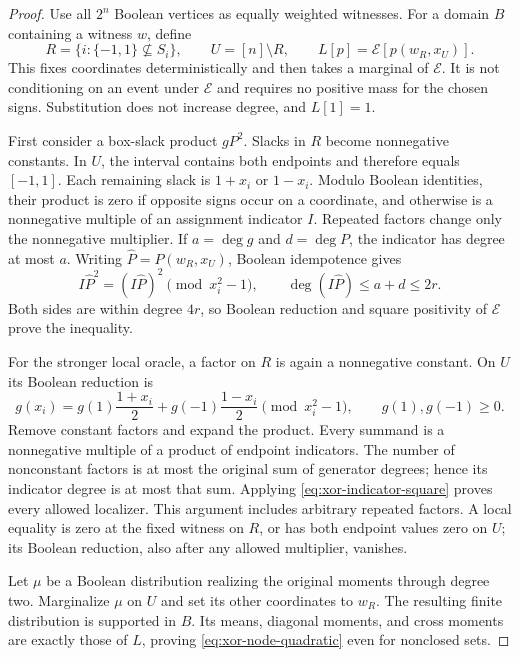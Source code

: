 \begin{proof}
Use all $2^n$ Boolean vertices as equally weighted witnesses. For a domain
$B$ containing a witness $w$, define
\[
 R=\{i:\{-1,1\}\not\subseteq S_i\},\qquad U=[n]\setminus R,
 \qquad L[p]=\mathcal E[p(w_R,x_U)].
\]
This fixes coordinates deterministically and then takes a marginal of
$\mathcal E$. It is not conditioning on an event under $\mathcal E$ and
requires no positive mass for the chosen signs. Substitution does not
increase degree, and $L[1]=1$.

First consider a box-slack product $gP^2$. Slacks in $R$ become
nonnegative constants. In $U$, the interval contains both endpoints and
therefore equals $[-1,1]$. Each remaining slack is $1+x_i$ or $1-x_i$.
Modulo Boolean identities, their product is zero if opposite signs occur
on a coordinate, and otherwise is a nonnegative multiple of an assignment
indicator $I$. Repeated factors change only the nonnegative multiplier.
If $a=\deg g$ and $d=\deg P$, the indicator has degree at most $a$.
Writing $\widehat P=P(w_R,x_U)$, Boolean idempotence gives
\begin{equation}\label{eq:xor-indicator-square}
 I\widehat P^2=(I\widehat P)^2\pmod{x_i^2-1},\qquad
 \deg(I\widehat P)\le a+d\le2r.
\end{equation}
Both sides are within degree $4r$, so Boolean reduction and square
positivity of $\mathcal E$ prove the inequality.

For the stronger local oracle, a factor on $R$ is again a nonnegative
constant. On $U$ its Boolean reduction is
\begin{equation}\label{eq:xor-local-endpoints}
 g(x_i)=g(1)\frac{1+x_i}{2}+g(-1)\frac{1-x_i}{2}
 \pmod{x_i^2-1},\qquad g(1),g(-1)\ge0.
\end{equation}
Remove constant factors and expand the product. Every summand is a
nonnegative multiple of a product of endpoint indicators. The number of
nonconstant factors is at most the original sum of generator degrees;
hence its indicator degree is at most that sum. Applying
\eqref{eq:xor-indicator-square} proves every allowed localizer. This
argument includes arbitrary repeated factors. A local equality is zero
at the fixed witness on $R$, or has both endpoint values zero on $U$;
its Boolean reduction, also after any allowed multiplier, vanishes.

Let $\mu$ be a Boolean distribution realizing the original moments through
degree two. Marginalize $\mu$ on $U$ and set its other coordinates to
$w_R$. The resulting finite distribution is supported in $B$. Its means,
diagonal moments, and cross moments are exactly those of $L$, proving
\eqref{eq:xor-node-quadratic} even for nonclosed sets.


\end{proof}
